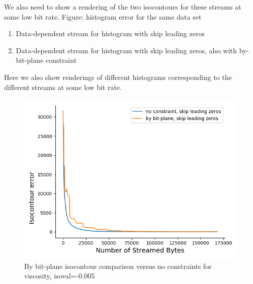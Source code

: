 We also need to show a rendering of the two isocontours for these streams at some low bit rate.
Figure: histogram error for the same data set
\begin{enumerate}
  \item Data-dependent stream for histogram with skip leading zeros
  \item Data-dependent stream for histogram with skip leading zeros, also with by-bit-plane constraint
\end{enumerate}  
  Here we also show renderings of different histograms corresponding to the different streams at some low bit rate.

\begin{figure}
  \centering
  \includegraphics[width=0.8\linewidth]{resources/isocontour-error-by-bit-plane-viscosity.png}
  \caption {By bit-plane isocontour comparison versus no constraints for viscosity, isoval=-0.005}
  \label{fig:by_bit_plane_isocontour}
\end{figure}
